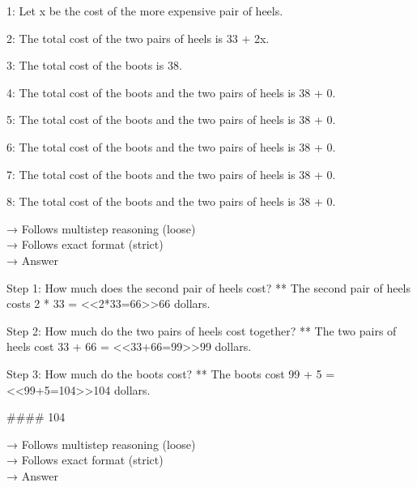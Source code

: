 \begin{tcolorbox}[breakable, title=Base Model + 10000 PFT examples]

1: Let x be the cost of the more expensive pair of heels.

2: The total cost of the two pairs of heels is 33 + 2x.

3: The total cost of the boots is 38.

4: The total cost of the boots and the two pairs of heels is 38 + 0.

5: The total cost of the boots and the two pairs of heels is 38 + 0.

6: The total cost of the boots and the two pairs of heels is 38 + 0.

7: The total cost of the boots and the two pairs of heels is 38 + 0.

8: The total cost of the boots and the two pairs of heels is 38 + 0.

{\color{teal}→ Follows multistep reasoning (loose)} \\
{\color{red}→ Follows exact format (strict)}\\
{\color{red}→ Answer} \\

    
\end{tcolorbox}


\begin{tcolorbox}[breakable, title=Base Model + 1000 SFT + 9000 PFT examples]

Step 1: How much does the second pair of heels cost? ** The second pair of heels costs 2 * 33 = <<2*33=66>>66 dollars.

Step 2: How much do the two pairs of heels cost together? ** The two pairs of heels cost 33 + 66 = <<33+66=99>>99 dollars.

Step 3: How much do the boots cost? ** The boots cost 99 + 5 = <<99+5=104>>104 dollars.

\#\#\#\# 104

{\color{teal}→ Follows multistep reasoning (loose)} \\
{\color{teal}→ Follows exact format (strict)}\\
{\color{teal}→ Answer} \\
    
\end{tcolorbox}